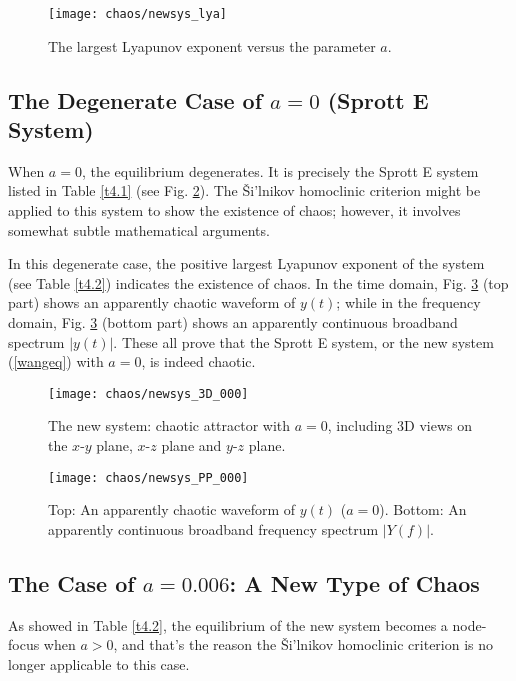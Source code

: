 \begin{figure}[h]
  \centering
  \texttt{[image: chaos/newsys\_lya]}
  \caption{\label{Lya}The largest Lyapunov exponent versus the
    parameter $a$.} 
\end{figure}

\subsection{The Degenerate Case of $a=0$ (Sprott E System)}

When $a=0$, the equilibrium degenerates. It is precisely the
Sprott E system listed in Table \ref{t4.1} (see Fig. \ref{0003D}). The
\v{S}i'lnikov homoclinic criterion might be applied to this system
to show the existence of chaos; however, it involves somewhat
subtle mathematical arguments.

In this degenerate case, the positive largest Lyapunov exponent of
the system (see Table \ref{t4.2}) indicates the existence of chaos.
In the time domain, Fig. \ref{000} (top part) shows an apparently
chaotic waveform of $y(t)$; while in the frequency domain, Fig.
\ref{000} (bottom part) shows an apparently continuous broadband
spectrum $|y(t)|$. These all prove that the Sprott E system, or
the new system (\ref{wangeq}) with $a=0$, is indeed chaotic.

\begin{figure}[h]
\centering
\texttt{[image: chaos/newsys\_3D\_000]}
 \caption{\label{0003D}The new system: chaotic attractor with
$a=0$, including 3D views on the $x$-$y$ plane, $x$-$z$ plane and
$y$-$z$ plane.} 
\end{figure}

\bigbreak

\begin{figure}[h]
\centering
\texttt{[image: chaos/newsys\_PP\_000]}
 \caption{\label{000}Top: An apparently chaotic waveform of
$y(t)$ ($a=0$). Bottom: An apparently continuous broadband
frequency spectrum $|Y(f)|$.}
\end{figure}

\subsection{The Case of $a=0.006$: A New Type of Chaos}

As showed in Table \ref{t4.2}, the equilibrium of the new system
becomes a node-focus when $a>0$, and that's the reason the
\v{S}i'lnikov homoclinic criterion is no longer applicable to this case.

